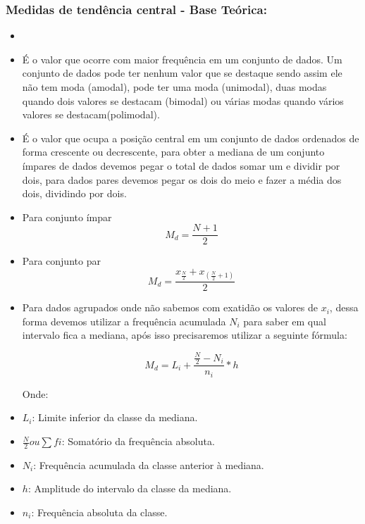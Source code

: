 \documentclass[a4paper,11pt]{article}
\begin{document}
\subsubsection*{Medidas de tendência central - Base Teórica:} 

\begin{itemize}
\item[]

    \item É o valor que ocorre com maior frequência em um conjunto de dados. Um conjunto de dados pode ter nenhum valor que se destaque sendo assim ele não tem moda (amodal), pode ter uma moda (unimodal), duas modas quando dois valores se destacam (bimodal) ou várias modas quando vários valores se destacam(polimodal).


    \item É o valor que ocupa a posição central em um conjunto de dados ordenados de forma crescente ou decrescente, para obter a mediana de um conjunto ímpares de dados devemos pegar o total de dados somar um e dividir por dois, para dados pares devemos pegar os dois do meio e fazer a média dos dois, dividindo por dois.

    \item Para conjunto ímpar \[M_d = \frac{N+1}{2}\]
    \item Para conjunto par \[M_d = \frac{x_{\frac{N}{2}} + x_{(\frac{N}{2} + 1)}}{2}\]

    \item Para dados agrupados onde não sabemos com exatidão os valores de $x_i$, dessa forma devemos utilizar a frequência acumulada $N_i$ para saber em qual intervalo fica a mediana, após isso precisaremos utilizar a seguinte fórmula:

    \[M_d = L_i + \frac{\frac{N}{2} - N_i }{n_i} * h\]

    Onde:
    \item $L_i$: Limite inferior da classe da mediana.
    \item $\frac{N}{2} ou \sum fi$: Somatório da frequência absoluta.
    \item $N_i$: Frequência acumulada da classe anterior à mediana.
    \item $h$: Amplitude do intervalo da classe da mediana.
    \item $n_i$: Frequência absoluta da classe.




\end{itemize}
\end{document}
